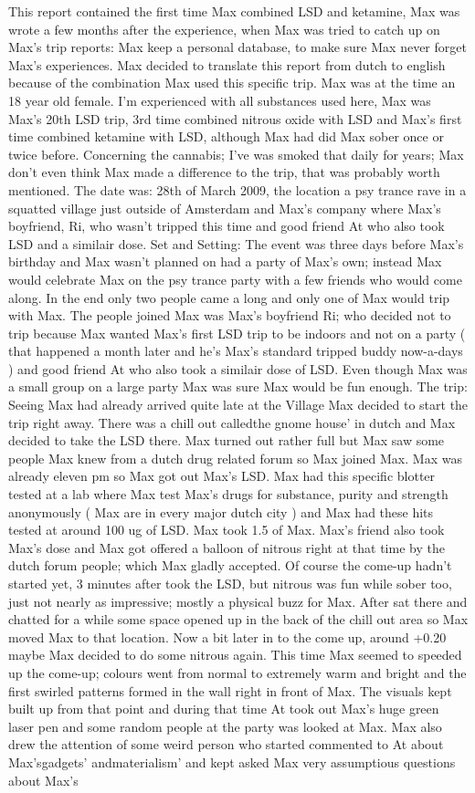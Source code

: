 \documentclass[12pt]{book}
\begin{document}
This report contained the first time Max combined LSD and ketamine, Max was wrote a few months after the experience, when Max was tried to catch up on Max's trip reports: Max keep a personal database, to make sure Max never forget Max's experiences. Max decided to translate this report from dutch to english because of the combination Max used this specific trip. Max was at the time an 18 year old female. I'm experienced with all substances used here, Max was Max's 20th LSD trip, 3rd time combined nitrous oxide with LSD and Max's first time combined ketamine with LSD, although Max had did Max sober once or twice before. Concerning the cannabis; I've was smoked that daily for years; Max don't even think Max made a difference to the trip, that was probably worth mentioned. The date was: 28th of March 2009, the location a psy trance rave in a squatted village just outside of Amsterdam and Max's company where Max's boyfriend, Ri, who wasn't tripped this time and good friend At who also took LSD and a similair dose. Set and Setting: The event was three days before Max's birthday and Max wasn't planned on had a party of Max's own; instead Max would celebrate Max on the psy trance party with a few friends who would come along. In the end only two people came a long and only one of Max would trip with Max. The people joined Max was Max's boyfriend Ri; who decided not to trip because Max wanted Max's first LSD trip to be indoors and not on a party ( that happened a month later and he's Max's standard tripped buddy now-a-days ) and good friend At who also took a similair dose of LSD. Even though Max was a small group on a large party Max was sure Max would be fun enough. The trip: Seeing Max had already arrived quite late at the Village Max decided to start the trip right away. There was a chill out calledthe gnome house' in dutch and Max decided to take the LSD there. Max turned out rather full but Max saw some people Max knew from a dutch drug related forum so Max joined Max. Max was already eleven pm so Max got out Max's LSD. Max had this specific blotter tested at a lab where Max test Max's drugs for substance, purity and strength anonymously ( Max are in every major dutch city ) and Max had these hits tested at around 100 ug of LSD. Max took 1.5 of Max. Max's friend also took Max's dose and Max got offered a balloon of nitrous right at that time by the dutch forum people; which Max gladly accepted. Of course the come-up hadn't started yet, 3 minutes after took the LSD, but nitrous was fun while sober too, just not nearly as impressive; mostly a physical buzz for Max. After sat there and chatted for a while some space opened up in the back of the chill out area so Max moved Max to that location. Now a bit later in to the come up, around +0.20 maybe Max decided to do some nitrous again. This time Max seemed to speeded up the come-up; colours went from normal to extremely warm and bright and the first swirled patterns formed in the wall right in front of Max. The visuals kept built up from that point and during that time At took out Max's huge green laser pen and some random people at the party was looked at Max. Max also drew the attention of some weird person who started commented to At about Max'sgadgets' andmaterialism' and kept asked Max very assumptious questions about Max's 
\end{document}
